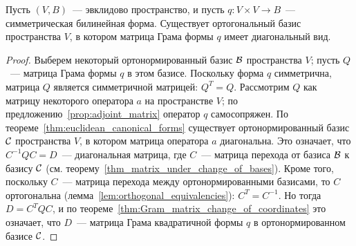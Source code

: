 \begin{corollary}
Пусть $(V,B)$~--- эвклидово пространство, и пусть
$q\colon V\times V\to B$~--- симметрическая билинейная
форма. Существует ортогональный базис пространства $V$, в котором
матрица Грама формы $q$ имеет диагональный вид.
\end{corollary}
\begin{proof}
Выберем некоторый ортонормированный базис $\mathcal B$ пространства $V$;
пусть $Q$~--- матрица Грама формы $q$ в этом базисе.
Поскольку форма $q$ симметрична, матрица $Q$ является симметричной
матрицей: $Q^T = Q$. Рассмотрим $Q$ как матрицу некоторого оператора
$a$ на пространстве $V$; по предложению~\ref{prop:adjoint_matrix}
оператор $q$ самосопряжен.
По теореме~\ref{thm:euclidean_canonical_forms} существует
ортонормированный базис $\mathcal C$ пространства $V$, в котором матрица
оператора $a$ диагональна. Это означает, что
$C^{-1}QC = D$~--- диагональная матрица, где $C$~--- матрица перехода
от базиса $\mathcal B$ к базису $\mathcal C$
(см. теорему~\ref{thm_matrix_under_change_of_bases}). Кроме того,
поскольку $C$~--- матрица перехода между ортонормированными базисами,
то $C$ ортогональна (лемма~\ref{lem:orthogonal_equivalencies}): $C^T =
C^{-1}$. Но тогда
$D = C^TQC$, и по теореме~\ref{thm:Gram_matrix_change_of_coordinates}
это означает, что $D$~--- матрица Грама
квадратичной формы $q$ в ортонормированном базисе $\mathcal C$.
\end{proof}

